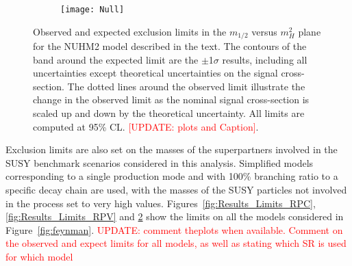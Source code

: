 \begin{figure}[p]
\centering
\begin{subfigure}[t]{0.49\textwidth}\texttt{[image: Null]}\caption{}\label{fig:limits_feynman_gtt}\end{subfigure}
\caption{
Observed and expected exclusion limits in the $m_{1/2}$ versus $m_H^2$ plane for the NUHM2 model described in the text.
The contours of the band around the expected limit are the $\pm$1$\sigma$ results, 
including all uncertainties except theoretical uncertainties on the signal cross-section. The dotted lines around the observed
limit illustrate the change in the observed limit as the nominal signal cross-section is scaled up and down
by the theoretical uncertainty. All limits are computed at 95\% CL. 
\textcolor{red}{[UPDATE: plots and Caption]}.
}
\label{fig:Results_Limits_NUHM2} 
\end{figure} 

Exclusion limits are also set on the masses of the superpartners involved in the SUSY benchmark scenarios considered in this analysis. 
Simplified models corresponding to a single production mode and with 100\% branching ratio to a specific decay chain are used, 
with the masses of the SUSY particles not involved in the process set to very high values. 
Figures~\ref{fig:Results_Limits_RPC}, \ref{fig:Results_Limits_RPV} and \ref{fig:Results_Limits_NUHM2} show the limits on all 
the models considered in Figure~\ref{fig:feynman}. \textcolor{red}{UPDATE: comment theplots when available. Comment on the observed and 
expect limits for all models, as well as stating which SR is used for which model } 





